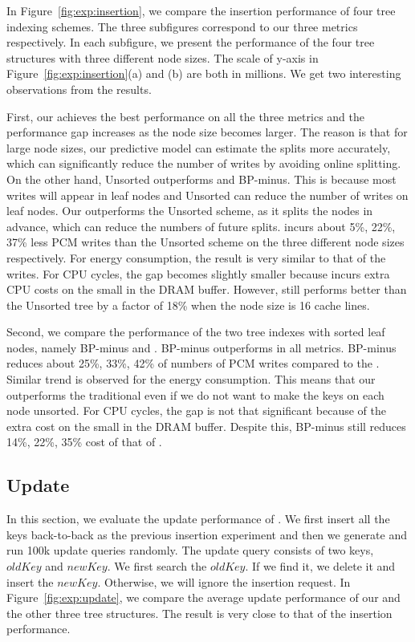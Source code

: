 In Figure~\ref{fig:exp:insertion}, we compare the insertion
performance of  four tree indexing schemes. The three subfigures
correspond to our three metrics respectively. In each subfigure,
we present the performance of the four tree structures with three
different node sizes. The scale of y-axis in Figure~\ref{fig:exp:insertion}(a)
and (b) are both in millions. We get two interesting observations from the results.

First, our \bptree achieves the best performance on all the three
metrics and the performance gap increases as the node size becomes
larger. The reason is that for large node sizes, our predictive model
can estimate the splits more accurately, which can significantly
reduce the number of writes by avoiding online splitting. On the
other hand, Unsorted  outperforms \bplustree and BP-minus. This is
because most  writes will appear in leaf nodes and Unsorted can
reduce the number of writes on leaf nodes. Our \bptree outperforms
the Unsorted scheme, as it splits the nodes in advance, which can
reduce the numbers of future splits. \bptree incurs  about 5\%,
22\%, 37\%  less PCM writes than the Unsorted scheme on the three
different node sizes respectively. For energy consumption, the
result is very similar to that of the writes. For CPU cycles, the
gap becomes slightly smaller because \bptree incurs extra CPU
costs on the small \bplustree in the DRAM buffer. However, \bptree
still performs better than the Unsorted tree by a factor of 18\%
when the node size is 16 cache lines.

Second, we compare the performance of the two tree indexes with
sorted leaf nodes, namely BP-minus and \bplustree. BP-minus
outperforms \bplustree in all metrics. BP-minus reduces about
25\%, 33\%, 42\% of numbers of PCM writes compared to the
\bplustree. Similar trend is observed for the energy
consumption. This means that our \bptree outperforms the traditional 
\bplustree even if we do not want to make the keys on each node unsorted.
 For CPU cycles, the gap is not that significant
because of the extra cost on the small \bplustree in the DRAM
buffer. Despite this, BP-minus still reduces 14\%, 22\%, 35\% cost
of that of \bplustree.

\subsection{Update}

In this section, we evaluate the update performance of \bptree. We
first insert all the keys back-to-back as the previous insertion
experiment and then we generate and run 100k update queries
randomly. The update query consists of two keys, $oldKey$ and
$newKey$. We first search the $oldKey$. If we find it, we delete
it and insert the $newKey$. Otherwise, we will ignore the
insertion request. In Figure~\ref{fig:exp:update}, we compare the
average update performance of our \bptree and the other three tree
structures. The result is very close to that of the insertion
performance.

